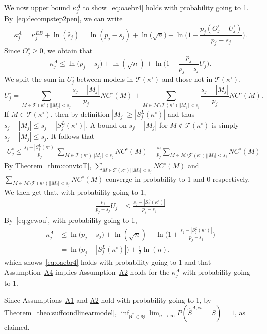 \documentclass[
  12pt]{article}
\newcommand{\M}{\mathcal{M}}
\newcommand{\T}{\mathcal{T}}
\newcommand{\bbeta}{\boldsymbol{\beta}}
\newcommand{\bB}{\mathfrak{B}}
\begin{document}
We now upper bound $\kappa^{A}_j$ to show~\eqref{eq:oaebr4} holds with probability going to 1. By~\eqref{eq:decompstep2pen}, we can write
    $$\kappa_j^{A}=\kappa_j^{EB}+\ln(\widehat s_j)= \ln(p_j-s_j)+\ln\big(\sqrt{n}\big)+\ln\Big(1-\frac{p_j(O^{\circ}_j-U^{\circ}_j)}{p_j-s_j}\Big).$$
Since $O_j^{\circ} \geq 0$, we obtain that %
\begin{equation*}
    \kappa^{A}_j \leq \ln\big(p_j-s_j\big)+\ln(\sqrt{n})+\ln\bigg(1+\frac{p_j}{p_j-s_j}U^{\circ}_j\bigg).
\end{equation*}
We split the sum in $U^{\circ}_j$ between models in $\T(\kappa^{\circ})$ and those not in $\T(\kappa^{\circ})$. 
$$U_j^{\circ} = \sum_{M \in \T(\kappa^{\circ}) | |M_j| < s_j}\frac{s_j-|M_j|}{p_j}NC^{\circ}(M)+\sum_{M \in \M\setminus\T(\kappa^{\circ}) | |M_j| < s_j}\frac{s_j-|M_j|}{p_j}NC^{\circ}(M).
$$
If $M\in \T(\kappa^{\circ})$, then by definition $|M_j|\geq |S^{L}_j(\kappa^{\circ})|$ and thus $s_j-|M_j|\leq s_j-|S^{L}_j(\kappa^{\circ})|$. A bound on $s_j-|M_j|$ for $M\not\in \T(\kappa^{\circ})$ is simply $s_j-|M_j|\leq s_j$. It follows that
\begin{eqnarray*}
    U^{\circ}_j \leq \frac{s_j-|S^{L}_j(\kappa^{\circ})|}{p_j}\sum_{M \in \T(\kappa^{\circ}) | |M_j| < s_j}NC^{\circ}(M)+  \frac{s_j}{p_j}\sum_{M \in \M \setminus \T(\kappa^{\circ})| |M_j| < s_j}NC^{\circ}(M)
\end{eqnarray*}
By Theorem~\ref{thm:convtoT}, $\sum_{M \in  \T(\kappa^{\circ})| |M_j| < s_j}NC^{\circ}(M)$ and $\sum_{M \in \M \setminus \T(\kappa^{\circ})| |M_j| < s_j}NC^{\circ}(M)$ converge in probability to 1 and 0 respectively. We then get that, with probability going to 1,
\begin{align}
    \frac{p_j}{p_j-s_j}U^{\circ}_j &\leq \frac{s_j-|S^{L}_j(\kappa^{\circ})|}{p_j-s_j} \label{eq:gewou}
\end{align}
By~\eqref{eq:gewou}, with probability going to 1,
\begin{align}\label{eq:finalupperboundkappaj2}
    \kappa_j^A &\leq  \ln\big(p_j-s_j\big)+\ln(\sqrt{n})+\ln\bigg(1+\frac{s_j-|S^{L}_j(\kappa^{\circ})|}{p_j-s_j}\bigg)\nonumber\\
    &= \ln\big(p_j-|S^{L}_j(\kappa^{\circ})|\big)+\frac{1}{2}\ln(n).
\end{align}
which shows~\eqref{eq:oaebr4} holds with probability going to 1 and that
Assumption~\hyperlink{lab:A4}{A4} implies Assumption~\hyperlink{lab:A2}{A2} holds for the $\kappa^{A}_j$ with probability going to 1. 

Since Assumptions~\hyperlink{lab:A1}{A1} and \hyperlink{lab:A2}{A2} hold with probability going to 1, by Theorem~\ref{theo:suffcondlinearmodel}, $\inf_{\bbeta^*\in\bB}\lim_{n\to\infty}P(\hat{S}^{A,ei}= S)= 1$, as claimed.
\end{document}
